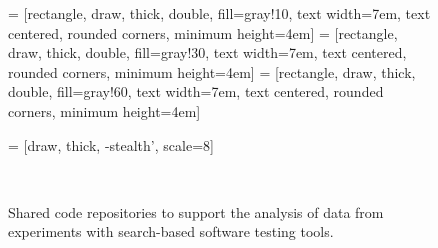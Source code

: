 
\begin{figure*}

  \begin{center}


     = [rectangle, draw, thick, double, fill=gray!10, text width=7em, text centered, rounded corners, minimum height=4em]
     = [rectangle, draw, thick, double, fill=gray!30, text width=7em, text centered, rounded corners, minimum height=4em]
     = [rectangle, draw, thick, double, fill=gray!60, text width=7em, text centered, rounded corners, minimum height=4em]


     = [draw, thick, -stealth', scale=8]


  \end{center}

  \caption{Shared code repositories to support the analysis of data from experiments with search-based software testing
  tools.}~\label{fig:statistical_repositories}

\end{figure*}
